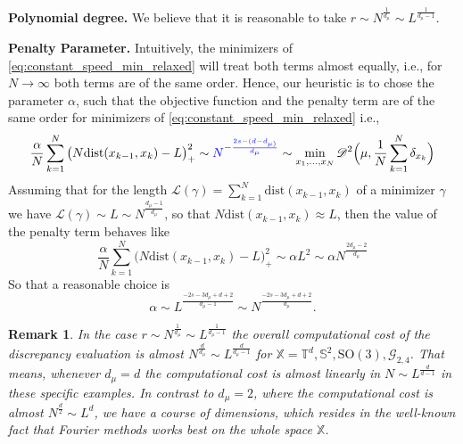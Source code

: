 \documentclass[draft,
a4paper,11pt,DIV=11,%
abstract=on%
]{scrartcl}
\newtheorem{remark}[thm]{Remark}
\begin{document}

\textbf{Polynomial degree.} We believe that it is reasonable to take $r \sim N^{\frac{1}{d_{\mu}}} \sim L^{\frac{1}{d_{\mu}-1}}$.

\textbf{Penalty Parameter.}
Intuitively, the minimizers of \eqref{eq:constant_speed_min_relaxed} will treat both terms almost equally, i.e., for $N\to \infty$ both terms are of the same order. Hence, our heuristic is to chose the parameter $\alpha$, such that the objective function and the penalty term are of the same order for minimizers of \eqref{eq:constant_speed_min_relaxed} i.e.,
\begin{equation}
  \label{eq:penalty_behavior}
  \frac{\alpha}{N} \sum_{k=1}^{N} \big(N \mathrm{dist}(x_{k-1},x_{k}) - L \big)_{+}^{2}  \sim {\color{blue}  N^{-\frac{2s-(d-d_{\mu)}}{d_{\mu}}}} \sim
  \min_{x_{1},\dots,x_{N}} \mathscr{D}^{2} \Big(\mu, \frac{1}{N} \sum_{k=1}^{N} \delta_{x_{k}}\Big) 
\end{equation}
Assuming that for the length $\mathcal L(\gamma) = \sum_{k=1}^{N}\mathrm{dist}(x_{k-1},x_{k})$ of a minimizer $\gamma$ we have $\mathcal L(\gamma) \sim L \sim N^{\frac{d_{\mu}-1}{d_{\mu}}}$, so that $N \mathrm{dist}(x_{k-1},x_{k}) \approx L$, then the value of the penalty term behaves like
\[
  \frac{\alpha}{N} \sum_{k=1}^{N} \big(N \mathrm{dist}(x_{k-1},x_{k}) - L \big)_{+}^{2} \sim  \alpha L^{2} \sim \alpha N^{\frac{2d_{\mu}-2}{d_{\mu}}}
\]
So that a reasonable choice is
\[
  \alpha \sim L^{\frac{-2s-3d_{\mu}+d+2}{d_{\mu}-1}} \sim N^{\frac{-2s-3d_{\mu}+d+2}{d_{\mu}}}.
\]


\begin{remark}
  In the case $r\sim N^{\frac{1}{d_{\mu}}} \sim L^{\frac{1}{d_{\mu}-1}}$ the overall computational cost of the discrepancy evaluation is almost $N^{\frac{d}{d_{\mu}}} \sim L^{\frac{d}{d_{\mu}-1}}$ for $\mathbb X = \mathbb T^{d}, \mathbb S^{2}, \mathrm{SO(3)}, \mathcal G_{2,4}$. That means, whenever $d_{\mu}=d$ the computational cost is almost linearly in $N \sim L^{\frac{d}{d-1}}$ in these specific examples. In contrast to $d_{\mu} = 2$, where the computational cost is almost $N^{\frac d2} \sim L^{d}$, we have a course of dimensions, which resides in the well-known fact that Fourier methods works best on the whole space $\mathbb X$.
\end{remark}
\end{document}
